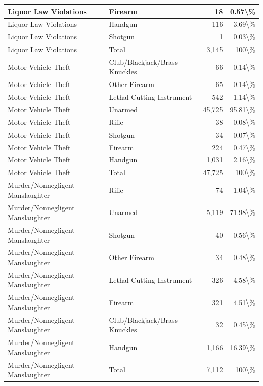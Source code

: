 \documentclass[
]{krantz}
\begin{document}
\begin{longtable}[t]{l|l|r|r}
Liquor Law Violations & Firearm & 18 & 0.57\textbackslash{}\%\\
\hline
Liquor Law Violations & Handgun & 116 & 3.69\textbackslash{}\%\\
\hline
Liquor Law Violations & Shotgun & 1 & 0.03\textbackslash{}\%\\
\hline
Liquor Law Violations & Total & 3,145 & 100\textbackslash{}\%\\
\hline
Motor Vehicle Theft & Club/Blackjack/Brass Knuckles & 66 & 0.14\textbackslash{}\%\\
\hline
Motor Vehicle Theft & Other Firearm & 65 & 0.14\textbackslash{}\%\\
\hline
Motor Vehicle Theft & Lethal Cutting Instrument & 542 & 1.14\textbackslash{}\%\\
\hline
Motor Vehicle Theft & Unarmed & 45,725 & 95.81\textbackslash{}\%\\
\hline
Motor Vehicle Theft & Rifle & 38 & 0.08\textbackslash{}\%\\
\hline
Motor Vehicle Theft & Shotgun & 34 & 0.07\textbackslash{}\%\\
\hline
Motor Vehicle Theft & Firearm & 224 & 0.47\textbackslash{}\%\\
\hline
Motor Vehicle Theft & Handgun & 1,031 & 2.16\textbackslash{}\%\\
\hline
Motor Vehicle Theft & Total & 47,725 & 100\textbackslash{}\%\\
\hline
Murder/Nonnegligent Manslaughter & Rifle & 74 & 1.04\textbackslash{}\%\\
\hline
Murder/Nonnegligent Manslaughter & Unarmed & 5,119 & 71.98\textbackslash{}\%\\
\hline
Murder/Nonnegligent Manslaughter & Shotgun & 40 & 0.56\textbackslash{}\%\\
\hline
Murder/Nonnegligent Manslaughter & Other Firearm & 34 & 0.48\textbackslash{}\%\\
\hline
Murder/Nonnegligent Manslaughter & Lethal Cutting Instrument & 326 & 4.58\textbackslash{}\%\\
\hline
Murder/Nonnegligent Manslaughter & Firearm & 321 & 4.51\textbackslash{}\%\\
\hline
Murder/Nonnegligent Manslaughter & Club/Blackjack/Brass Knuckles & 32 & 0.45\textbackslash{}\%\\
\hline
Murder/Nonnegligent Manslaughter & Handgun & 1,166 & 16.39\textbackslash{}\%\\
\hline
Murder/Nonnegligent Manslaughter & Total & 7,112 & 100\textbackslash{}\%\\

\end{longtable}
\end{document}
